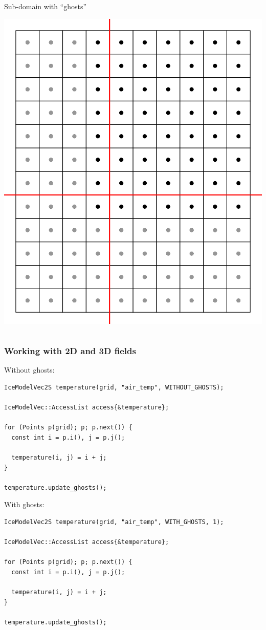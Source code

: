 \documentclass[hide notes,intlimits]{beamer}
\begin{document}
\begin{frame}
\begin{columns}
    \begin{column}{0.5\linewidth}
    Sub-domain with ``ghosts''
      \begin{center}
      \includegraphics[width=0.75\linewidth]{grid-5}
    \end{center}
    \end{column}
  \end{columns}
\end{frame}

\begin{frame}[fragile]
  \frametitle{Working with 2D and 3D fields}

  Without ghosts:
\begin{lstlisting}
IceModelVec2S temperature(grid, "air_temp", WITHOUT_GHOSTS);

IceModelVec::AccessList access{&temperature};

for (Points p(grid); p; p.next()) {
  const int i = p.i(), j = p.j();

  temperature(i, j) = i + j;
}

temperature.update_ghosts();
\end{lstlisting}

  With ghosts:

\begin{lstlisting}
IceModelVec2S temperature(grid, "air_temp", WITH_GHOSTS, 1);

IceModelVec::AccessList access{&temperature};

for (Points p(grid); p; p.next()) {
  const int i = p.i(), j = p.j();

  temperature(i, j) = i + j;
}

temperature.update_ghosts();
\end{lstlisting}
\end{frame}
\end{document}
